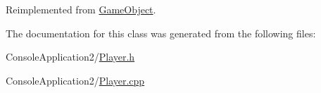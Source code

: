 Reimplemented from \hyperlink{class_game_object_a53b129d55688652e25e6515d80e669ca}{Game\+Object}.



The documentation for this class was generated from the following files\+:\begin{DoxyCompactItemize}
\item 
Console\+Application2/\hyperlink{_player_8h}{Player.\+h}\item 
Console\+Application2/\hyperlink{_player_8cpp}{Player.\+cpp}\end{DoxyCompactItemize}
